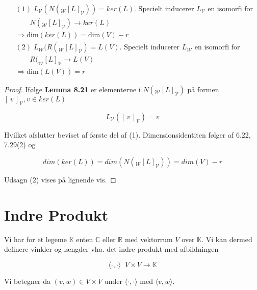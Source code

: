 \documentclass[paper=a4, fontsize=11pt]{scrartcl} %
\begin{document}
	
	\begin{align*}
	&(1) \; L_{\mathcal{V}}(N(_{\mathcal{W}}[L]_{\mathcal{V}})) = ker(L). \text{ Specielt inducerer $L_{\mathcal{V}}$ en isomorfi for } \\
	& \qquad N(_{\mathcal{W}}[L]_{\mathcal{V}}) \rightarrow ker(L)\\
	& \Rightarrow \mbox{dim}(ker(L)) = \mbox{dim}(V) - r\\
	&(2) \; L_{\mathcal{W}}(R(_{\mathcal{W}}[L]_{\mathcal{V}}) = L(V). \text{ Specielt inducerer $L_{\mathcal{W}}$ en isomorfi for } \\
	& \qquad R(_{\mathcal{W}}[L]_{\mathcal{V}} \rightarrow L(V)\\
	& \Rightarrow \mbox{dim}(L(V)) = r
	\end{align*}
	\begin{proof}
		
		Ifølge \textbf{Lemma 8.21} er elementerne i $N(_{\mathcal{W}}[L]_{\mathcal{V}})$ på formen $[\,v\,]_{\mathcal{V}}, v \in ker(L)$
		
		\[L_{\mathcal{V}}([\,v\,]_{\mathcal{V}}) = v\]
		
		Hvilket afslutter beviset af første del af (1). Dimensionsidentiten følger af 6.22, 7.29(2) og
		
		\[dim(ker(L)) = dim(N(_{\mathcal{W}}[L]_{\mathcal{V}})) = dim(V) - r\]
		
		Udsagn (2) vises på lignende vis.
	\end{proof}
	\newpage
	
	\section{Indre Produkt}
	
	
	Vi har for et legeme $\mathbb{K}$ enten $\mathbb{C}$ eller $\mathbb{R}$ med vektorrum $V$ over $\mathbb{K}$. Vi kan dermed definere vinkler og længder vha. det indre produkt med afbildningen
	
	\[\langle \cdot , \cdot \rangle \; \; V \times V \rightarrow \mathbb{K}\]
	
	Vi betegner da $(v,w) \in V \times V$ under $\langle \cdot , \cdot \rangle$ med $\langle v,w \rangle$.
	
\end{document}
